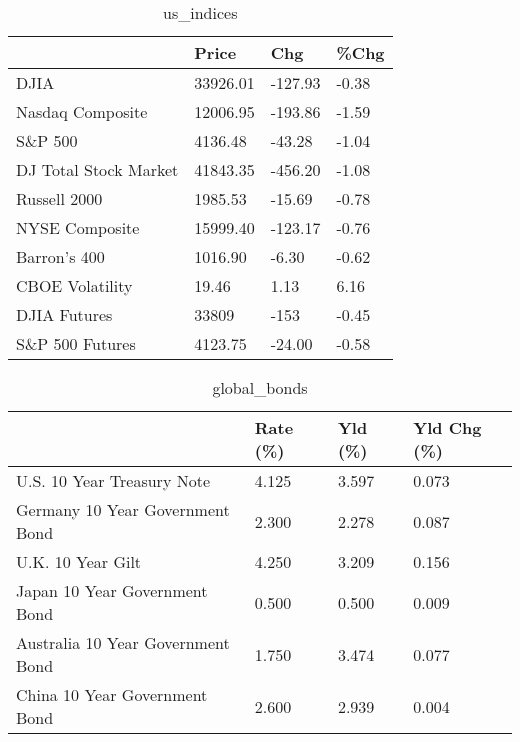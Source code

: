 \documentclass{article}%
\begin{document}
%


\begin{table}[htbp]%
\caption{us\_indices}%
\centering%
\begin{adjustbox}{width=1\textwidth}%
\begin{tabular}{llll}
\toprule
                      &    Price &     Chg &  \%Chg \\
\midrule
                 DJIA & 33926.01 & -127.93 & -0.38 \\
     Nasdaq Composite & 12006.95 & -193.86 & -1.59 \\
              S\&P 500 &  4136.48 &  -43.28 & -1.04 \\
DJ Total Stock Market & 41843.35 & -456.20 & -1.08 \\
         Russell 2000 &  1985.53 &  -15.69 & -0.78 \\
       NYSE Composite & 15999.40 & -123.17 & -0.76 \\
         Barron's 400 &  1016.90 &   -6.30 & -0.62 \\
      CBOE Volatility &    19.46 &    1.13 &  6.16 \\
         DJIA Futures &    33809 &    -153 & -0.45 \\
      S\&P 500 Futures &  4123.75 &  -24.00 & -0.58 \\
\bottomrule
\end{tabular}
%
\end{adjustbox}%
\end{table}

%


\begin{table}[htbp]%
\caption{global\_bonds}%
\centering%
\begin{adjustbox}{width=1\textwidth}%
\begin{tabular}{llll}
\toprule
                                  & Rate (\%) & Yld (\%) & Yld Chg (\%) \\
\midrule
       U.S. 10 Year Treasury Note &    4.125 &   3.597 &       0.073 \\
  Germany 10 Year Government Bond &    2.300 &   2.278 &       0.087 \\
                U.K. 10 Year Gilt &    4.250 &   3.209 &       0.156 \\
    Japan 10 Year Government Bond &    0.500 &   0.500 &       0.009 \\
Australia 10 Year Government Bond &    1.750 &   3.474 &       0.077 \\
    China 10 Year Government Bond &    2.600 &   2.939 &       0.004 \\
\bottomrule
\end{tabular}
%
\end{adjustbox}%
\end{table}
\end{document}
